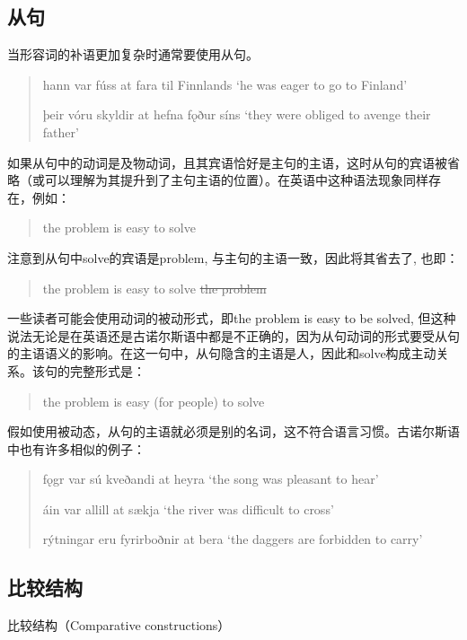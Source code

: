 \subsection{从句}
当形容词的补语更加复杂时通常要使用从句。
\begin{quote}
    hann var fúss at fara til Finnlands `he was eager to go to Finland'

    þeir vóru skyldir at hefna fǫður síns `they were obliged to avenge their father'
\end{quote}
如果从句中的动词是及物动词，且其宾语恰好是主句的主语，这时从句的宾语被省略（或可以理解为其提升到了主句主语的位置）。在英语中这种语法现象同样存在，例如：
\begin{quote}
    the problem is easy to solve
\end{quote}
注意到从句中solve的宾语是problem, 与主句的主语一致，因此将其省去了, 也即：
\begin{quote}
    the problem is easy to solve \sout{the problem}
\end{quote}
一些读者可能会使用动词的被动形式，即\dag the problem is easy to be solved, 但这种说法无论是在英语还是古诺尔斯语中都是不正确的，因为从句动词的形式要受从句的主语语义的影响。在这一句中，从句隐含的主语是人，因此和solve构成主动关系。该句的完整形式是：
\begin{quote}
    the problem is easy (for people) to solve
\end{quote}
假如使用被动态，从句的主语就必须是别的名词，这不符合语言习惯。古诺尔斯语中也有许多相似的例子：
\begin{quote}
    fǫgr var sú kveðandi at heyra `the song was pleasant to hear'

    áin var allill at sækja `the river was difficult to cross'

    rýtningar eru fyrirboðnir at bera `the daggers are forbidden to carry'
\end{quote}
\subsection{比较结构}
比较结构（Comparative constructions）
